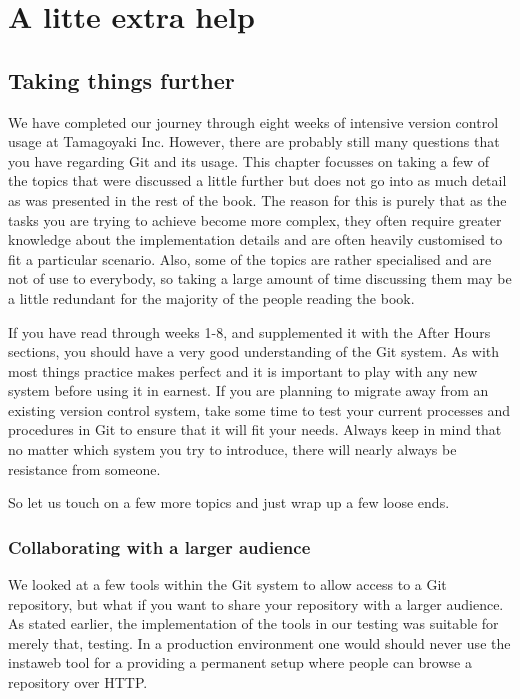 \cleardoublepage
\chapter{A litte extra help}
\section{Taking things further}

We have completed our journey through eight weeks of intensive version control usage at Tamagoyaki Inc.
However, there are probably still many questions that you have regarding Git and its usage.
This chapter focusses on taking a few of the topics that were discussed a little further but does not go into as much detail as was presented in the rest of the book.
The reason for this is purely that as the tasks you are trying to achieve become more complex, they often require greater knowledge about the implementation details
and are often heavily customised to fit a particular scenario.
Also, some of the topics are rather specialised and are not of use to everybody, so taking a large amount of time discussing them may be a little redundant for the majority of the people reading the book.

If you have read through weeks 1-8, and supplemented it with the After Hours sections, you should have a very good understanding of the Git system.
As with most things practice makes perfect and it is important to play with any new system before using it in earnest.
If you are planning to migrate away from an existing version control system, take some time to test your current processes and procedures in Git to ensure that it will fit your needs.
Always keep in mind that no matter which system you try to introduce, there will nearly always be resistance from someone.

So let us touch on a few more topics and just wrap up a few loose ends.

\subsection{Collaborating with a larger audience}
We looked at a few tools within the Git system to allow access to a Git repository, but what if you want to share your repository with a larger audience.
As stated earlier, the implementation of the tools in our testing was suitable for merely that, testing.
In a production environment one would should never use the instaweb tool for a providing a permanent setup where people can browse a repository over HTTP.

